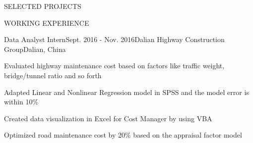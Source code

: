 \documentclass{resume} %
\begin{document}
\begin{rSection}{SELECTED PROJECTS}


\end{rSection} 

\begin{rSection}{WORKING EXPERIENCE} \itemsep -3pt  


\begin{rSubsection}{Data Analyst Intern}{Sept. 2016 - Nov. 2016}{Dalian Highway Construction Group}{Dalian, China}
\item Evaluated highway maintenance cost based on factors like traffic weight, bridge/tunnel ratio and so forth
\item Adapted Linear and Nonlinear Regression model in SPSS and the model error is within 10\%
\item Created data visualization in Excel for Cost Manager by using VBA
\item Optimized road maintenance cost by 20\% based on the appraisal factor model
\end{rSubsection} 

\end{rSection} 
\end{document}
